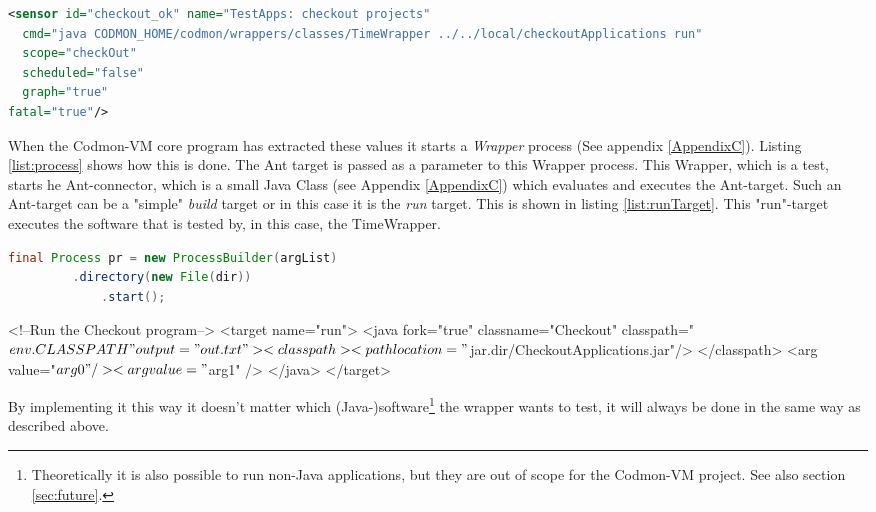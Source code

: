 \documentclass{article}
\newcommand{\project}{Codmon-VM}
\begin{document}
\begin{lstlisting}[frame=shadowbox, language=XML,showstringspaces=false]
<sensor id="checkout_ok" name="TestApps: checkout projects" 
  cmd="java CODMON_HOME/codmon/wrappers/classes/TimeWrapper ../../local/checkoutApplications run"  
  scope="checkOut" 
  scheduled="false" 
  graph="true" 
fatal="true"/>
\end{lstlisting} 

\noindent When the \project{} core program has extracted these values it starts a \emph{Wrapper} process (See appendix \ref{AppendixC}). Listing \ref{list:process} shows how this is done. The Ant target is 
passed as a parameter to this Wrapper process. This Wrapper, which is a test, starts he Ant-connector, which is a small Java Class (see Appendix \ref{AppendixC}) which evaluates and executes the Ant-target. 
Such an Ant-target can be a "simple" \emph{build} target or in this case it is the \emph{run} target. This is shown in listing \ref{list:runTarget}. This "run"-target executes the software that is tested by, 
in this case, the TimeWrapper.\\
 

\begin{lstlisting}[frame=shadowbox, language=Java,showstringspaces=false]
final Process pr = new ProcessBuilder(argList)
 		 .directory(new File(dir)) 
    		 .start();
\end{lstlisting} 


\begin{code}[frame=shadowbox, language=XML,showstringspaces=false]
	<!--Run the Checkout program-->
	<target name="run">
		<java  fork="true" classname="Checkout" classpath="${env.CLASSPATH}" output="out.txt">
	  		<classpath>
				<path location="${jar.dir}/CheckoutApplications.jar"/>
	        	</classpath>
			<arg value="${arg0}" />
			<arg value="${arg1}" />
		</java>
	</target>
\end{code} 

\noindent By implementing it this way it doesn't matter which (Java-)software\footnote{Theoretically it is also possible to run non-Java applications, but they are out of scope for the \project{} project. 
See also section \ref{sec:future}.} the wrapper wants to test, it will always be done in the same way as described above.
\end{document}
